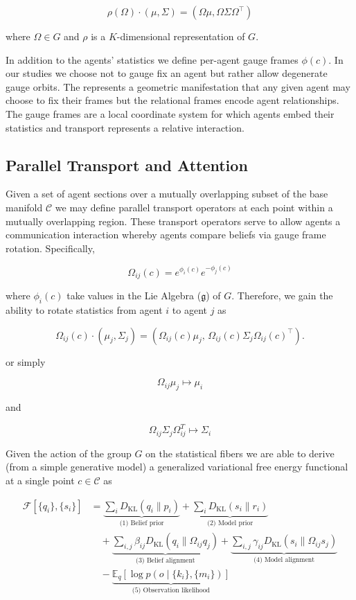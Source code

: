 \documentclass[twoside,11pt]{article}
\begin{document}
\begin{equation}
    \rho(\Omega) \cdot (\mu, \Sigma) = (\Omega\mu, \Omega\Sigma\Omega^\top)
\end{equation}

where $\Omega \in G$ and $\rho$ is a $K$-dimensional representation of $G$.

In addition to the agents' statistics we define per-agent gauge frames $\phi(c)$.  In our studies we choose not to gauge fix an agent but rather allow degenerate gauge orbits.  The represents a geometric manifestation that any given agent may choose to fix their frames but the relational frames encode agent relationships. The gauge frames are a local coordinate system for which agents embed their statistics and transport represents a relative interaction.


\subsection{Parallel Transport and Attention}

Given a set of agent sections over a mutually overlapping subset of the base manifold $\mathcal{C}$ we may define parallel transport operators at each point within a mutually overlapping region.  These transport operators serve to allow agents a communication interaction whereby agents compare beliefs via gauge frame rotation.  Specifically,

$$
\Omega_{ij}(c) = e^{\phi_i(c)}e^{-\phi_j(c)}
$$

where $\phi_i(c)$ take values in the Lie Algebra ($\mathfrak{g}$) of $G$.  Therefore, we gain the ability to rotate statistics from agent $i$ to agent $j$ as


\begin{equation}
\Omega_{ij}(c) \cdot (\mu_j, \Sigma_j) = \left(\Omega_{ij}(c)\mu_j, \, \Omega_{ij}(c)\Sigma_j\Omega_{ij}(c)^\top\right).
\end{equation}

or simply

$$
\Omega_{ij}\mu_j \longmapsto \mu_i
$$

and

$$
\Omega_{ij}\Sigma_j \Omega_{ij}^T \longmapsto \Sigma_i
$$

Given the action of the group $G$ on the statistical fibers we are able to derive (from a simple generative model) a generalized variational free energy functional at a single point $c \in \mathcal{C}$ as


\begin{align}
\mathcal{F}[\{q_i\}, \{s_i\}] 
&= \underbrace{\sum_i D_{\mathrm{KL}}(q_i \| p_i)}_{\text{(1) Belief prior}} 
+ \underbrace{\sum_i D_{\mathrm{KL}}(s_i \| r_i)}_{\text{(2) Model prior}} \nonumber \\
&\quad + \underbrace{\sum_{i,j} \beta_{ij} D_{\mathrm{KL}}(q_i \| \Omega_{ij} q_j)}_{\text{(3) Belief alignment}}
+ \underbrace{\sum_{i,j} \gamma_{ij} D_{\mathrm{KL}}(s_i \| {\Omega}_{ij} s_j)}_{\text{(4) Model alignment}} \nonumber \\
&\quad - \underbrace{\mathbb{E}_q[\log p(o \mid \{k_i\}, \{m_i\})]}_{\text{(5) Observation likelihood}}
\label{eq:free_energy_decomposed}
\end{align}
\end{document}
